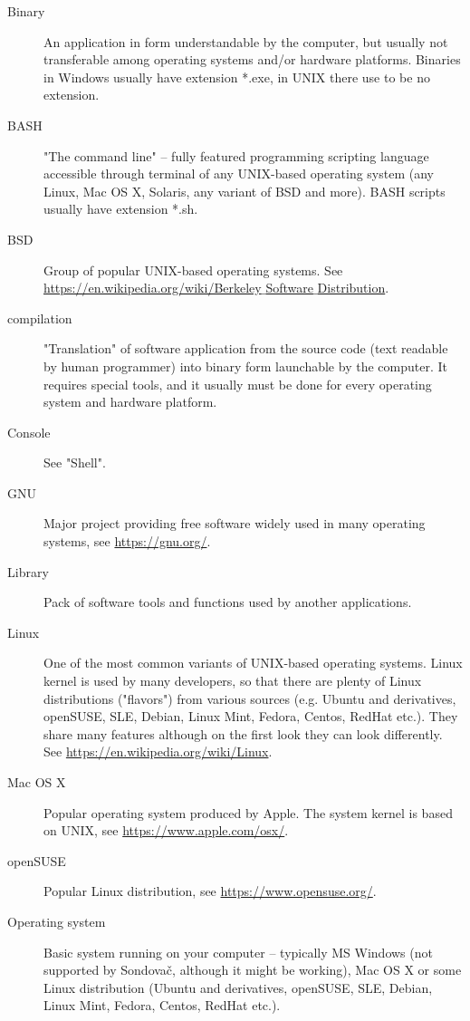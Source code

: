 \documentclass[a4paper, 11pt, twoside]{article}
\begin{document}
\begin{description}
\item[Binary] An application in form understandable by the computer, but usually not transferable among operating systems and/or hardware platforms. Binaries in Windows usually have extension *.exe, in UNIX there use to be no extension.
\item[BASH] "The command line" -- fully featured programming scripting language accessible through terminal of any UNIX-based operating system (any Linux, Mac OS X, Solaris, any variant of BSD and more). BASH scripts usually have extension *.sh.
\item[BSD] Group of popular UNIX-based operating systems. See \href{https://en.wikipedia.org/wiki/Berkeley_Software_Distribution}{https://en.wikipedia.org/wiki/Berkeley$\_$Software$\_$Distribution}.
\item[compilation] "Translation" of software application from the source code (text readable by human programmer) into binary form launchable by the computer. It requires special tools, and it usually must be done for every operating system and hardware platform.
\item[Console] See "Shell".
\item[GNU] Major project providing free software widely used in many operating systems, see \href{https://gnu.org/}{https://gnu.org/}.
\item[Library] Pack of software tools and functions used by another applications.
\item[Linux] One of the most common variants of UNIX-based operating systems. Linux kernel is used by many developers, so that there are plenty of Linux distributions ("flavors") from various sources (e.g. Ubuntu and derivatives, openSUSE, SLE, Debian, Linux Mint, Fedora, Centos, RedHat etc.). They share many features although on the first look they can look differently. See \href{https://en.wikipedia.org/wiki/Linux}{https://en.wikipedia.org/wiki/Linux}.
\item[Mac OS X] Popular operating system produced by Apple. The system kernel is based on UNIX, see \href{https://www.apple.com/osx/}{https://www.apple.com/osx/}.
\item[openSUSE] Popular Linux distribution, see \href{https://www.opensuse.org/}{https://www.opensuse.org/}.
\item[Operating system] Basic system running on your computer -- typically MS Windows (not supported by Sondovač, although it might be working), Mac OS X or some Linux distribution (Ubuntu and derivatives, openSUSE, SLE, Debian, Linux Mint, Fedora, Centos, RedHat etc.).

\end{description}
\end{document}
